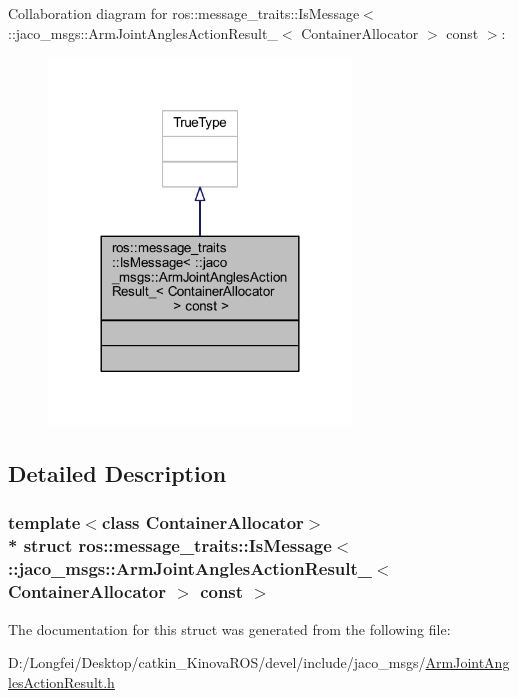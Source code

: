 Collaboration diagram for ros\+:\+:message\+\_\+traits\+:\+:Is\+Message$<$ \+:\+:jaco\+\_\+msgs\+:\+:Arm\+Joint\+Angles\+Action\+Result\+\_\+$<$ Container\+Allocator $>$ const $>$\+:
\nopagebreak
\begin{figure}[H]
\begin{center}
\leavevmode
\includegraphics[width=228pt]{d4/d3b/structros_1_1message__traits_1_1IsMessage_3_01_1_1jaco__msgs_1_1ArmJointAnglesActionResult___3_034e13a8275cd0f85deddd726971495d3}
\end{center}
\end{figure}


\subsection{Detailed Description}
\subsubsection*{template$<$class Container\+Allocator$>$\\*
struct ros\+::message\+\_\+traits\+::\+Is\+Message$<$ \+::jaco\+\_\+msgs\+::\+Arm\+Joint\+Angles\+Action\+Result\+\_\+$<$ Container\+Allocator $>$ const  $>$}



The documentation for this struct was generated from the following file\+:\begin{DoxyCompactItemize}
\item 
D\+:/\+Longfei/\+Desktop/catkin\+\_\+\+Kinova\+R\+O\+S/devel/include/jaco\+\_\+msgs/\hyperlink{ArmJointAnglesActionResult_8h}{Arm\+Joint\+Angles\+Action\+Result.\+h}\end{DoxyCompactItemize}
